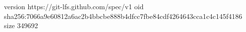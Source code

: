 version https://git-lfs.github.com/spec/v1
oid sha256:7066a9e60812a6ac2b4bbcbe888b4dfcc7fbe84cdf4264643cca1c4c145f4186
size 349692
